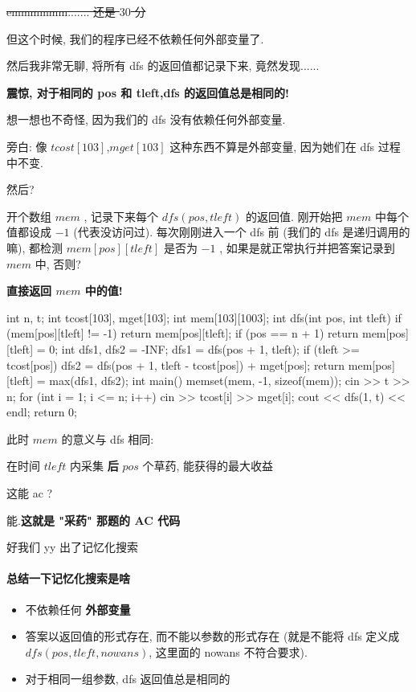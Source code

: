 \sout{emmmmmm....... 还是 ${30}$ 分}

但这个时候, 我们的程序已经不依赖任何外部变量了.

然后我非常无聊, 将所有 dfs 的返回值都记录下来, 竟然发现......

\textbf{震惊, 对于相同的 pos 和 tleft,dfs 的返回值总是相同的!}

想一想也不奇怪, 因为我们的 dfs 没有依赖任何外部变量.

旁白: 像 $tcost[103]$,$mget[103]$ 这种东西不算是外部变量, 因为她们在 dfs 过程中不变.

然后?

开个数组 $mem$ , 记录下来每个 $dfs(pos,tleft)$ 的返回值. 刚开始把 $mem$ 中每个值都设成 $-1$ (代表没访问过). 每次刚刚进入一个 dfs 前 (我们的 dfs 是递归调用的嘛), 都检测 $mem[pos][tleft]$ 是否为 $-1$ , 如果是就正常执行并把答案记录到 $mem$ 中, 否则?

\textbf{直接返回 $mem$ 中的值!}

\begin{cppcode}
int n, t;
int tcost[103], mget[103];
int mem[103][1003];
int dfs(int pos, int tleft) {
  if (mem[pos][tleft] != -1) return mem[pos][tleft];
  if (pos == n + 1) return mem[pos][tleft] = 0;
  int dfs1, dfs2 = -INF;
  dfs1 = dfs(pos + 1, tleft);
  if (tleft >= tcost[pos]) dfs2 = dfs(pos + 1, tleft - tcost[pos]) + mget[pos];
  return mem[pos][tleft] = max(dfs1, dfs2);
}
int main() {
  memset(mem, -1, sizeof(mem));
  cin >> t >> n;
  for (int i = 1; i <= n; i++) cin >> tcost[i] >> mget[i];
  cout << dfs(1, t) << endl;
  return 0;
}
\end{cppcode}

此时 $mem$ 的意义与 dfs 相同:

\begin{QUOTE}{}{}
在时间 $tleft$ 内采集 \textbf{ 后 } $pos$ 个草药, 能获得的最大收益
\end{QUOTE}

这能 ac ?

能.\textbf{这就是 "采药" 那题的 AC 代码}

好我们 yy 出了记忆化搜索

\paragraph{总结一下记忆化搜索是啥}

\begin{itemize}
\item 不依赖任何 \textbf{外部变量}
\item 答案以返回值的形式存在, 而不能以参数的形式存在 (就是不能将 dfs 定义成 $dfs(pos ,tleft , nowans )$, 这里面的 nowans 不符合要求).
\item 对于相同一组参数, dfs 返回值总是相同的
\end{itemize}

